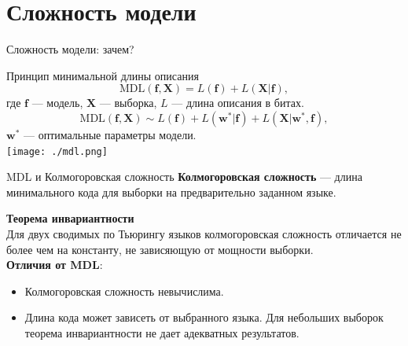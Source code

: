 \documentclass[10pt,pdf,utf8,russian,aspectratio=169]{beamer}
\begin{document}
\iffalse
\section{Сложность модели}
\begin{frame}{Сложность модели: зачем?}
\begin{figure}
  \centering
\label{fig:1}\qquad

\end{figure}


\end{frame}


\begin{frame}{Принцип минимальной длины описания}
\[
\text{MDL}(\mathbf{f}, \mathbf{X}) = L(\mathbf{f}) + L(\mathbf{X}|\mathbf{f}),
\]
где $\mathbf{f}$ --- модель, $\mathbf{X}$ --- выборка, $L$ --- длина описания в битах.
\\
\[
\text{MDL}(\mathbf{f}, \mathbf{X}) \sim L(\mathbf{f}) + L(\mathbf{w}^*| \mathbf{f}) + L(\mathbf{X}|\mathbf{w}^*, \mathbf{f}),
\]
$\mathbf{w}^*$ --- оптимальные параметры модели.\\

\texttt{[image: ./mdl.png]}

\end{frame}

\begin{frame}{MDL и Колмогоровская сложность}
\textbf{Колмогоровская сложность} --- длина минимального кода для выборки на предварительно заданном языке.

\textbf{Теорема инвариантности}\\
Для двух сводимых по Тьюрингу языков колмогоровская сложность  отличается не более чем на константу, не зависяющую от мощности выборки.\\

\textbf{Отличия от MDL}:
\begin{itemize}
\item Колмогоровская сложность невычислима.
\item Длина кода может зависеть от выбранного языка. Для небольших выборок теорема инвариантности не дает адекватных результатов.
\end{itemize}
\end{frame}
\end{document}
